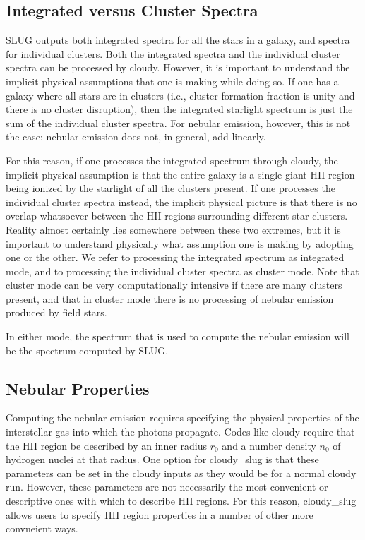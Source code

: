 \documentclass[letterpaper,10pt,english]{sphinxmanual}
\begin{document}
\subsection{Integrated versus Cluster Spectra}
\label{\detokenize{cloudy:integrated-versus-cluster-spectra}}\label{\detokenize{cloudy:sssec-cloudy-integrated-cluster}}
SLUG outputs both integrated spectra for all the stars in a galaxy,
and spectra for individual clusters. Both the integrated spectra and
the individual cluster spectra can be processed by cloudy. However, it
is important to understand the implicit physical assumptions that one
is making while doing so. If one has a galaxy where all stars are in
clusters (i.e., cluster formation fraction is unity and there is no
cluster disruption), then the integrated starlight spectrum is just
the sum of the individual cluster spectra. For nebular emission,
however, this is not the case: nebular emission does not, in general,
add linearly.

For this reason, if one processes the integrated spectrum through
cloudy, the implicit physical assumption is that the entire galaxy is
a single giant HII region being ionized by the starlight of all the
clusters present. If one processes the individual cluster spectra
instead, the implicit physical picture is that there is no overlap
whatsoever between the HII regions surrounding different star
clusters. Reality almost certainly lies somewhere between these two
extremes, but it is important to understand physically what assumption
one is making by adopting one or the other. We refer to processing the
integrated spectrum as integrated mode, and to processing the
individual cluster spectra as cluster mode. Note that cluster mode can
be very computationally intensive if there are many clusters present,
and that in cluster mode there is no processing of nebular emission
produced by field stars.

In either mode, the spectrum that is used to compute the nebular
emission will be the  spectrum computed
by SLUG.


\subsection{Nebular Properties}
\label{\detokenize{cloudy:nebular-properties}}\label{\detokenize{cloudy:sssec-cloudy-nebular-properties}}
Computing the nebular emission requires specifying the physical
properties of the interstellar gas into which the
photons propagate. Codes like cloudy require that the HII region be
described by an inner radius \(r_0\) and a number density
\(n_{0}\) of hydrogen nuclei at that radius. One option for
cloudy\_slug is that these parameters can be set in the cloudy inputs
as they would be for a normal cloudy run. However, these parameters
are not necessarily the most convenient or descriptive ones with which
to describe HII regions. For this reason, cloudy\_slug allows users to
specify HII region properties in a number of other more convneient
ways.
\end{document}
